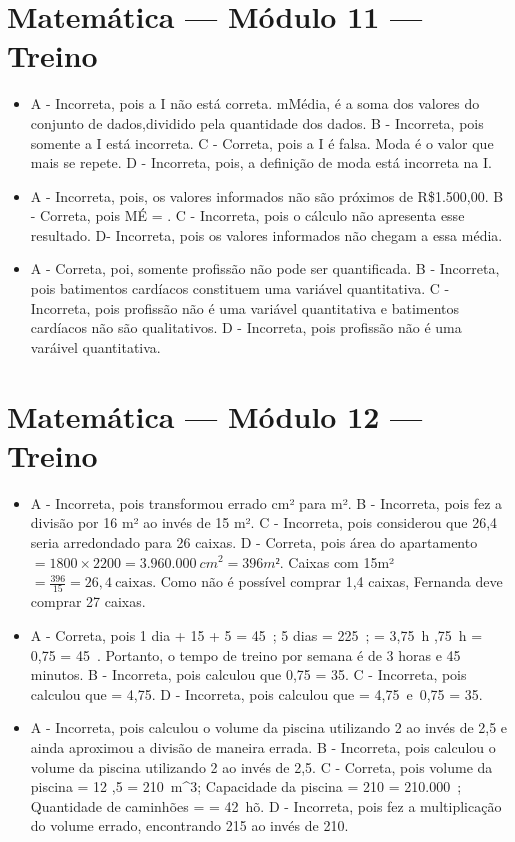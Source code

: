 \section*{Matemática — Módulo 11 — Treino}

\begin{itemize}
\item A - Incorreta, pois a I não está correta. mMédia, é a soma dos valores
do conjunto de dados,dividido pela quantidade dos dados.
B - Incorreta, pois somente a I está incorreta.
C - Correta, pois a I é falsa. Moda é o valor que mais se repete.
D - Incorreta, pois, a definição de moda está incorreta na I.
\item A - Incorreta, pois, os valores informados não são próximos de
R\$1.500,00.
B - Correta, pois
MÉ =  .
C - Incorreta, pois o cálculo não apresenta esse resultado.
D- Incorreta, pois os valores informados não chegam a essa média.
\item A - Correta, poi, somente profissão não pode ser quantificada.
B - Incorreta, pois batimentos cardíacos constituem uma variável
quantitativa.
C - Incorreta, pois profissão não é uma variável quantitativa e
batimentos cardíacos não são qualitativos.
D - Incorreta, pois profissão não é uma varáivel quantitativa.
\end{itemize}

\section*{Matemática — Módulo 12 — Treino}

\begin{itemize}
\item A - Incorreta, pois transformou errado cm² para m².
B - Incorreta, pois fez a divisão por 16 m² ao invés de 15 m².
C - Incorreta, pois considerou que 26,4 seria arredondado para 26
caixas.
D - Correta, pois área do apartamento \(= 1800 \times 2200 = 3.960.000\ cm^{2} = 396m²\). Caixas com 15m² \(= \frac{396}{15} = 26,4\ \text{caixas}\). Como não é possível comprar 1,4 caixas, Fernanda deve comprar 27 caixas.
\item A - Correta, pois 1 dia  + 15 + 5 = 45\ ; 5 dias   = 225\ ;  = 3,75\ h ,75\ h = 0,75  = 45\ . Portanto, o tempo de treino por semana é de 3 horas e 45 minutos.
B - Incorreta, pois calculou que 0,75  = 35.
C - Incorreta, pois calculou que  = 4,75.
D - Incorreta, pois calculou que  = 4,75\ e\ 0,75  = 35.
\item A - Incorreta, pois calculou o volume da piscina utilizando 2 ao invés
de 2,5 e ainda aproximou a divisão de maneira errada.
B - Incorreta, pois calculou o volume da piscina utilizando 2 ao invés
de 2,5.
C - Correta, pois volume da piscina = 12  ,5 = 210\ m^{3}; Capacidade da piscina = 210  = 210.000\ ; Quantidade de caminhões =
 = 42\ hõ.
D - Incorreta, pois fez a multiplicação do volume errado, encontrando
215 ao invés de 210.
\end{itemize}

